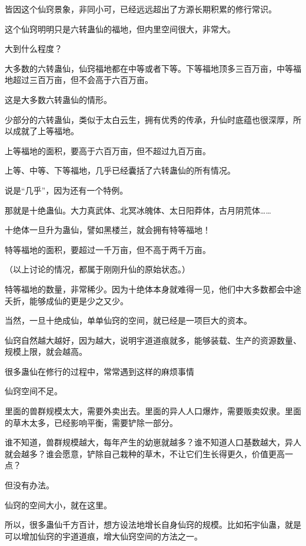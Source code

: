 \begin{this_body}
皆因这个仙窍景象，非同小可，已经远远超出了方源长期积累的修行常识。

这个仙窍明明只是六转蛊仙的福地，但内里空间很大，非常大。

大到什么程度？

大多数的六转蛊仙，仙窍福地都在中等或者下等。下等福地顶多三百万亩，中等福地超过三百万亩，但不会高于六百万亩。

这是大多数六转蛊仙的情形。

少部分的六转蛊仙，类似于太白云生，拥有优秀的传承，升仙时底蕴也很深厚，所以成就了上等福地。

上等福地的面积，要高于六百万亩，但不超过九百万亩。

上等、中等、下等福地，几乎已经囊括了六转蛊仙的所有情况。

说是“几乎”，因为还有一个特例。

那就是十绝蛊仙。大力真武体、北冥冰魄体、太日阳莽体，古月阴荒体……

十绝体一旦升为蛊仙，譬如黑楼兰，就会拥有特等福地！

特等福地的面积，要超过一千万亩，但不高于两千万亩。

（以上讨论的情况，都属于刚刚升仙的原始状态。）

特等福地的数量，非常稀少。因为十绝体本身就难得一见，他们中大多数都会中途夭折，能够成仙的更是少之又少。

当然，一旦十绝成仙，单单仙窍的空间，就已经是一项巨大的资本。

仙窍自然越大越好，因为越大，说明宇道道痕就多，能够装载、生产的资源数量、规模上限，就会越高。

很多蛊仙在修行的过程中，常常遇到这样的麻烦事情

仙窍空间不足。

里面的兽群规模太大，需要外卖出去。里面的异人人口爆炸，需要贩卖奴隶。里面的草木太多，已经影响平衡，需要铲除一部分。

谁不知道，兽群规模越大，每年产生的幼崽就越多？谁不知道人口基数越大，异人就会越多？谁会愿意，铲除自己栽种的草木，不让它们生长得更久，价值更高一点？

但没有办法。

仙窍的空间大小，就在这里。

所以，很多蛊仙千方百计，想方设法地增长自身仙窍的规模。比如拓宇仙蛊，就是可以增加仙窍的宇道道痕，增大仙窍空间的方法之一。

\end{this_body}


